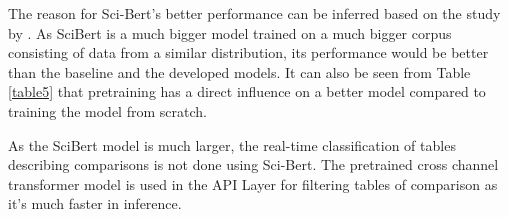 The reason for Sci-Bert's better performance can be inferred based on the study by \cite{hernandez2021scaling}. As SciBert is a much bigger model trained on a much bigger corpus consisting of data from a similar distribution, its performance would be better than the baseline and the developed models. It can also be seen from Table \ref{table5} that pretraining has a direct influence on a better model compared to training the model from scratch. 

As the SciBert model is much larger, the real-time classification of tables describing comparisons is not done using Sci-Bert. The pretrained cross channel transformer model is used in the API Layer for filtering tables of comparison as it's much faster in inference. 
